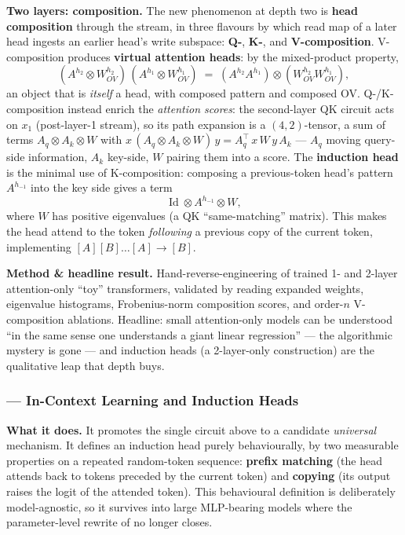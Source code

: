 \textbf{Two layers: composition.} The new phenomenon at depth two is \textbf{head composition} through the stream, in three flavours by which read map of a later head ingests an earlier head's write subspace: \textbf{Q-}, \textbf{K-}, and \textbf{V-composition}. V-composition produces \textbf{virtual attention heads}: by the mixed-product property,
\[
(A^{h_2}\otimes W_{OV}^{h_2})\,(A^{h_1}\otimes W_{OV}^{h_1}) \;=\; (A^{h_2}A^{h_1})\otimes(W_{OV}^{h_2}W_{OV}^{h_1}),
\]
an object that is \emph{itself} a head, with composed pattern and composed OV. Q-/K-composition instead enrich the \emph{attention scores}: the second-layer QK circuit acts on $x_1$ (post-layer-1 stream), so its path expansion is a $(4,2)$-tensor, a sum of terms $A_q\otimes A_k\otimes W$ with $x\,(A_q\otimes A_k\otimes W)\,y = A_q^{\top}\,x\,W\,y\,A_k$ --- $A_q$ moving query-side information, $A_k$ key-side, $W$ pairing them into a score. The \textbf{induction head} is the minimal use of K-composition: composing a previous-token head's pattern $A^{h_{-1}}$ into the key side gives a term
\[
\operatorname{Id}\otimes A^{h_{-1}}\otimes W,
\]
where $W$ has positive eigenvalues (a QK ``same-matching'' matrix). This makes the head attend to the token \emph{following} a previous copy of the current token, implementing $[A][B]\dots[A]\to[B]$.

\textbf{Method \& headline result.} Hand-reverse-engineering of trained 1- and 2-layer attention-only ``toy'' transformers, validated by reading expanded weights, eigenvalue histograms, Frobenius-norm composition scores, and order-$n$ V-composition ablations. Headline: small attention-only models can be understood ``in the same sense one understands a giant linear regression'' --- the algorithmic mystery is gone --- and induction heads (a 2-layer-only construction) are the qualitative leap that depth buys.

\subsubsection*{\textcite{induction-heads} --- In-Context Learning and Induction Heads}

\textbf{What it does.} It promotes the single circuit above to a candidate \emph{universal} mechanism. It defines an induction head purely behaviourally, by two measurable properties on a repeated random-token sequence: \textbf{prefix matching} (the head attends back to tokens preceded by the current token) and \textbf{copying} (its output raises the logit of the attended token). This behavioural definition is deliberately model-agnostic, so it survives into large MLP-bearing models where the parameter-level rewrite of \textcite{framework} no longer closes.

